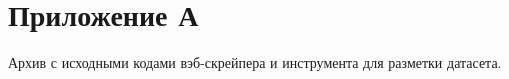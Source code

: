 \documentclass[../main]{subfiles}
\begin{document}
\newpage
{}
\section*{Приложение А}
\label{sec:appendix}

Архив с исходными кодами вэб-скрейпера и инструмента для разметки датасета.
\end{document}
